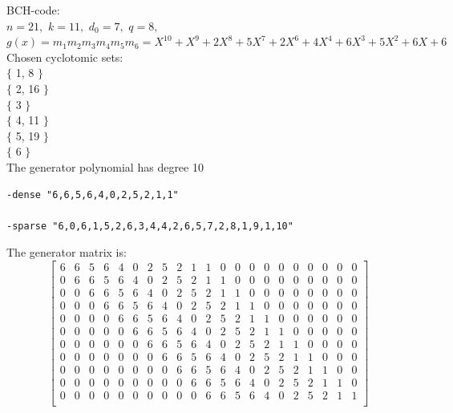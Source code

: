 \noindent
BCH-code:\\
$n=21,$ $k=11,$ $d_0=7,$ $q=8,$ \\
$g(x) = m_{1}m_{2}m_{3}m_{4}m_{5}m_{6}=
X^{10} + X^{9} + 2X^{8} + 5X^{7} + 2X^{6} + 4X^{4} + 6X^{3} + 5X^{2} + 6X + 6$
\\
\noindent
Chosen cyclotomic sets:\\
\noindent $\{$ 1, 8 $\}$\\
$\{$ 2, 16 $\}$\\
$\{$ 3 $\}$\\
$\{$ 4, 11 $\}$\\
$\{$ 5, 19 $\}$\\
$\{$ 6 $\}$\\
\bigskip
The generator polynomial has degree 10
\begin{verbatim}
-dense "6,6,5,6,4,0,2,5,2,1,1"

-sparse "6,0,6,1,5,2,6,3,4,4,2,6,5,7,2,8,1,9,1,10"

\end{verbatim}
The generator matrix is:
$$
\left[
\begin{array}{*{21}{c}}
6 & 6 & 5 & 6 & 4 & 0 & 2 & 5 & 2 & 1 & 1 & 0 & 0 & 0 & 0 & 0 & 0 & 0 & 0 & 0 & 0\\
0 & 6 & 6 & 5 & 6 & 4 & 0 & 2 & 5 & 2 & 1 & 1 & 0 & 0 & 0 & 0 & 0 & 0 & 0 & 0 & 0\\
0 & 0 & 6 & 6 & 5 & 6 & 4 & 0 & 2 & 5 & 2 & 1 & 1 & 0 & 0 & 0 & 0 & 0 & 0 & 0 & 0\\
0 & 0 & 0 & 6 & 6 & 5 & 6 & 4 & 0 & 2 & 5 & 2 & 1 & 1 & 0 & 0 & 0 & 0 & 0 & 0 & 0\\
0 & 0 & 0 & 0 & 6 & 6 & 5 & 6 & 4 & 0 & 2 & 5 & 2 & 1 & 1 & 0 & 0 & 0 & 0 & 0 & 0\\
0 & 0 & 0 & 0 & 0 & 6 & 6 & 5 & 6 & 4 & 0 & 2 & 5 & 2 & 1 & 1 & 0 & 0 & 0 & 0 & 0\\
0 & 0 & 0 & 0 & 0 & 0 & 6 & 6 & 5 & 6 & 4 & 0 & 2 & 5 & 2 & 1 & 1 & 0 & 0 & 0 & 0\\
0 & 0 & 0 & 0 & 0 & 0 & 0 & 6 & 6 & 5 & 6 & 4 & 0 & 2 & 5 & 2 & 1 & 1 & 0 & 0 & 0\\
0 & 0 & 0 & 0 & 0 & 0 & 0 & 0 & 6 & 6 & 5 & 6 & 4 & 0 & 2 & 5 & 2 & 1 & 1 & 0 & 0\\
0 & 0 & 0 & 0 & 0 & 0 & 0 & 0 & 0 & 6 & 6 & 5 & 6 & 4 & 0 & 2 & 5 & 2 & 1 & 1 & 0\\
0 & 0 & 0 & 0 & 0 & 0 & 0 & 0 & 0 & 0 & 6 & 6 & 5 & 6 & 4 & 0 & 2 & 5 & 2 & 1 & 1\\
\end{array}
\right]
$$

